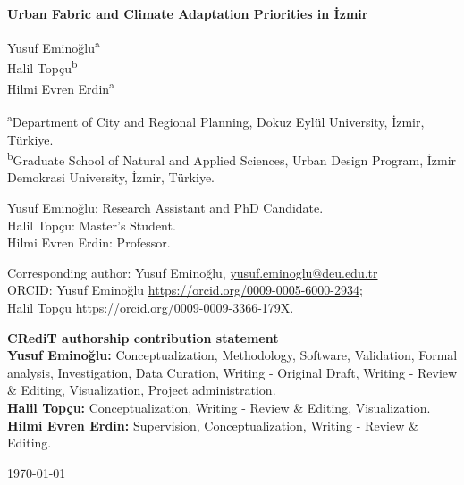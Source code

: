 \documentclass[12pt]{article}
\begin{document}
\begin{titlepage}
\centering

\vspace*{2cm}

{\Large\bfseries Urban Fabric and Climate Adaptation Priorities in \.{I}zmir\par}

\vspace{2cm}

Yusuf Emino\u{g}lu\textsuperscript{a}\\
Halil Top\c{c}u\textsuperscript{b}\\
Hilmi Evren Erdin\textsuperscript{a}

\vspace{1.5cm}

\textsuperscript{a}Department of City and Regional Planning, Dokuz Eyl\"ul University, \.{I}zmir, T\"urkiye.\\
\textsuperscript{b}Graduate School of Natural and Applied Sciences, Urban Design Program, \.{I}zmir Demokrasi University, \.{I}zmir, T\"urkiye.

\vspace{1cm}

Yusuf Emino\u{g}lu: Research Assistant and PhD Candidate.\\
Halil Top\c{c}u: Master's Student.\\
Hilmi Evren Erdin: Professor.

\vspace{1.5cm}

Corresponding author: Yusuf Emino\u{g}lu, \href{mailto:yusuf.eminoglu@deu.edu.tr}{yusuf.eminoglu@deu.edu.tr}\\
ORCID: Yusuf Emino\u{g}lu \url{https://orcid.org/0009-0005-6000-2934};\\
Halil Top\c{c}u \url{https://orcid.org/0009-0009-3366-179X}.

\vspace{1.5cm}

\begin{flushleft}
\textbf{CRediT authorship contribution statement}\\
\textbf{Yusuf Emino\u{g}lu:} Conceptualization, Methodology, Software, Validation, Formal analysis, Investigation, Data Curation, Writing - Original Draft, Writing - Review \& Editing, Visualization, Project administration. \\
\textbf{Halil Top\c{c}u:} Conceptualization, Writing - Review \& Editing, Visualization.\\
\textbf{Hilmi Evren Erdin:} Supervision, Conceptualization, Writing - Review \& Editing.
\end{flushleft}

\vfill

\today

\end{titlepage}
\end{document}
